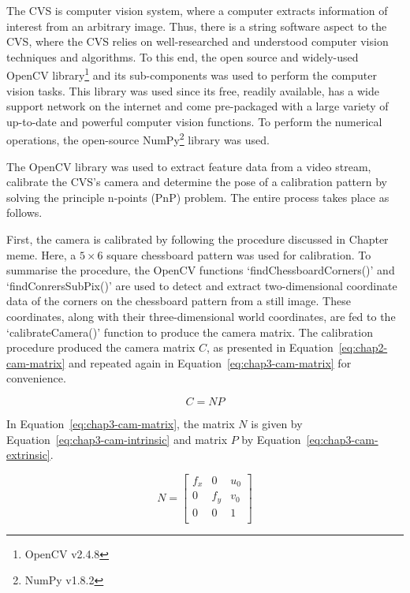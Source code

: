 The CVS is computer vision system, where a computer extracts information of interest from an arbitrary image. Thus, there is a string software aspect to the CVS, where the CVS relies on well-researched and understood computer vision techniques and algorithms. To this end, the open source and widely-used OpenCV library\footnote{OpenCV v2.4.8} and its sub-components was used to perform the computer vision tasks. This library was used since its free, readily available, has a wide support network on the internet and come pre-packaged with a large variety of up-to-date and powerful computer vision functions. To perform the numerical operations, the open-source NumPy\footnote{NumPy v1.8.2} library was used. 

The OpenCV library was used to extract feature data from a video stream, calibrate the CVS's camera and determine the pose of a calibration pattern by solving the principle n-points (PnP) problem. The entire process takes place as follows. 

First, the camera is calibrated by following the procedure discussed in Chapter meme. Here, a $5\times6$ square chessboard pattern was used for calibration. To summarise the procedure, the OpenCV functions `findChessboardCorners()' and `findConrersSubPix()' are used to detect and extract two-dimensional coordinate data of the corners on the chessboard pattern from a still image. These coordinates, along with their three-dimensional world coordinates, are fed to the `calibrateCamera()' function to produce the camera matrix. The calibration procedure produced the camera matrix $C$, as presented in Equation~\ref{eq:chap2-cam-matrix} and repeated again in Equation~\ref{eq:chap3-cam-matrix} for convenience. 

\begin{equation}
  \label{eq:chap3-cam-matrix}
  C = 
  NP
\end{equation}

In Equation~\ref{eq:chap3-cam-matrix}, the matrix $N$ is given by Equation~\ref{eq:chap3-cam-intrinsic} and matrix $P$ by Equation~\ref{eq:chap3-cam-extrinsic}.

\begin{equation}
  \label{eq:chap3-cam-intrinsic}
  N = 
  \begin{bmatrix}
    f_x & 0   & u_0 \\
    0   & f_y & v_0 \\
    0   & 0   & 1   \\
  \end{bmatrix}
\end{equation}

